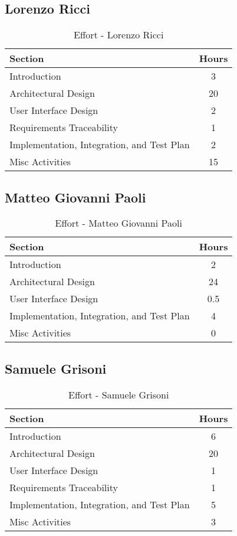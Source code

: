 \subsection*{Lorenzo Ricci}
\begin{table}[H]
    \centering
\begin{tabular}{|l|c|}
        \hline
        \textbf{Section} & \textbf{Hours} \\ \hline
        Introduction & 3 \\ \hline
        Architectural Design & 20 \\ \hline
        User Interface Design & 2 \\ \hline
        Requirements Traceability & 1\\ \hline
        Implementation, Integration, and Test Plan & 2 \\ \hline
        Misc Activities & 15 \\ \hline
    \end{tabular}
    \caption{Effort - Lorenzo Ricci}
    \label{tab:effortricci}
\end{table}
\subsection*{Matteo Giovanni Paoli}
\begin{table}[H]
    \centering
\begin{tabular}{|l|c|}
        \hline
        \textbf{Section} & \textbf{Hours} \\ \hline
        Introduction & 2 \\ \hline
        Architectural Design & 24 \\ \hline
        User Interface Design & 0.5 \\ \hline
        Implementation, Integration, and Test Plan & 4 \\ \hline
        Misc Activities & 0 \\ \hline
    \end{tabular}
    \caption{Effort - Matteo Giovanni Paoli}
    \label{tab:effortpaoli}
\end{table}
\subsection*{Samuele Grisoni}
\begin{table}[H]
    \centering
\begin{tabular}{|l|c|}
        \hline
        \textbf{Section} & \textbf{Hours} \\ \hline
        Introduction & 6 \\ \hline
        Architectural Design & 20 \\ \hline
        User Interface Design & 1 \\ \hline
        Requirements Traceability & 1\\ \hline
        Implementation, Integration, and Test Plan & 5 \\ \hline
        Misc Activities & 3\\ \hline
    \end{tabular}
    \caption{Effort - Samuele Grisoni}
    \label{tab:effortgrisoni}
\end{table}